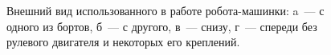 \begin{figure}[h!]
    \begin{minipage}[h]{0.47\textwidth}
    \end{minipage}
    \hfill
    \begin{minipage}[h]{0.47\textwidth}
    \end{minipage}
    \vfill
    \begin{minipage}[h]{0.47\textwidth}
    \end{minipage}
    \hfill
    \begin{minipage}[h]{0.47\textwidth}
    \end{minipage}
    \caption{Внешний вид использованного в работе робота-машинки: a~--- с одного из бортов, б~--- с другого, в~--- снизу, г~--- спереди без рулевого двигателя и некоторых его креплений.}
    \label{img_robot_gen_view}
\end{figure}

\newpage
\mbox{}
